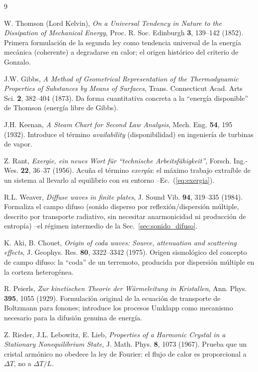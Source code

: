 \documentclass[11pt,a4paper]{article}
\begin{document}
\begin{thebibliography}{9}

W. Thomson (Lord Kelvin), \textit{On a Universal Tendency in Nature to the
Dissipation of Mechanical Energy}, Proc. R. Soc. Edinburgh \textbf{3},
139--142 (1852). Primera formulación de la segunda ley como tendencia
universal de la energía mecánica (coherente) a degradarse en calor;
el origen histórico del criterio de Gonzalo.

J.W. Gibbs, \textit{A Method of Geometrical Representation of the
Thermodynamic Properties of Substances by Means of Surfaces}, Trans.
Connecticut Acad. Arts Sci. \textbf{2}, 382--404 (1873). Da forma
cuantitativa concreta a la ``energía disponible'' de Thomson (energía
libre de Gibbs).

J.H. Keenan, \textit{A Steam Chart for Second Law Analysis}, Mech. Eng.
\textbf{54}, 195 (1932). Introduce el término \textit{availability}
(disponibilidad) en ingeniería de turbinas de vapor.

Z. Rant, \textit{Exergie, ein neues Wort für ``technische
Arbeitsfähigkeit''}, Forsch. Ing.-Wes. \textbf{22}, 36--37 (1956). Acuña
el término \textit{exergía}: el máximo trabajo extraíble de un sistema al
llevarlo al equilibrio con su entorno --Ec.~(\ref{eq:exergia}).

R.L. Weaver, \textit{Diffuse waves in finite plates}, J. Sound Vib.
\textbf{94}, 319--335 (1984). Formaliza el campo difuso (sonido disperso
por reflexión/dispersión múltiple, descrito por transporte radiativo, sin
necesitar anarmonicidad ni producción de entropía) --el régimen
intermedio de la Sec.~\ref{sec:sonido_difuso}.

K. Aki, B. Chouet, \textit{Origin of coda waves: Source, attenuation and
scattering effects}, J. Geophys. Res. \textbf{80}, 3322--3342 (1975).
Origen sismológico del concepto de campo difuso: la ``coda'' de un
terremoto, producida por dispersión múltiple en la corteza heterogénea.

R. Peierls, \textit{Zur kinetischen Theorie der Wärmeleitung in Kristallen},
Ann. Phys. \textbf{395}, 1055 (1929). Formulación original de la ecuación de
transporte de Boltzmann para fonones; introduce los procesos Umklapp como
mecanismo necesario para la difusión genuina de energía.

Z. Rieder, J.L. Lebowitz, E. Lieb, \textit{Properties of a Harmonic Crystal
in a Stationary Nonequilibrium State}, J. Math. Phys. \textbf{8}, 1073
(1967). Prueba que un cristal armónico no obedece la ley de Fourier: el
flujo de calor es proporcional a $\Delta T$, no a $\Delta T/L$.


\end{thebibliography}
\end{document}
